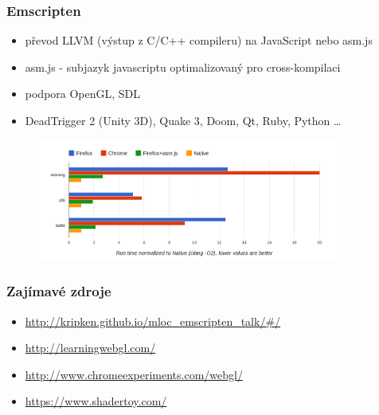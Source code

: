 \documentclass{beamer}
\begin{document}
	
		\begin{frame}[t,fragile]
		\frametitle{Emscripten}					
		\begin{itemize}
			\item převod LLVM (výstup z C/C++ compileru) na JavaScript nebo asm.js
			\item asm.js - subjazyk javascriptu optimalizovaný pro cross-kompilaci
			\item podpora OpenGL, SDL
			\item DeadTrigger 2 (Unity 3D), Quake 3, Doom, Qt, Ruby, Python \dots
		\end{itemize}	
		\begin{figure}		
		\centering
		\includegraphics[height=40mm]{img/micro3b.png}
		\end{figure}

	\end{frame}
	
		
	\begin{frame}[t,fragile]
	
		\frametitle{Zajímavé zdroje}					
		\begin{itemize}
			\item \footnotesize{\url{http://kripken.github.io/mloc_emscripten_talk/#/}}
			\item \url{http://learningwebgl.com/}
			\item \url{http://www.chromeexperiments.com/webgl/}
			\item \url{https://www.shadertoy.com/}
		\end{itemize}			

	\end{frame}
	
	
\end{document}
